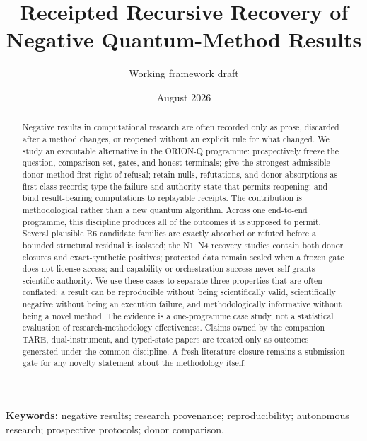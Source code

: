 \documentclass[11pt]{article}
\title{Receipted Recursive Recovery of Negative Quantum-Method Results}
\author{Working framework draft}
\date{August 2026}
\begin{document}
\maketitle

\begin{abstract}
Negative results in computational research are often recorded only as prose, discarded after a method changes, or reopened without an explicit rule for what changed. We study an executable alternative in the ORION-Q programme: prospectively freeze the question, comparison set, gates, and honest terminals; give the strongest admissible donor method first right of refusal; retain nulls, refutations, and donor absorptions as first-class records; type the failure and authority state that permits reopening; and bind result-bearing computations to replayable receipts. The contribution is methodological rather than a new quantum algorithm. Across one end-to-end programme, this discipline produces all of the outcomes it is supposed to permit. Several plausible R6 candidate families are exactly absorbed or refuted before a bounded structural residual is isolated; the N1--N4 recovery studies contain both donor closures and exact-synthetic positives; protected data remain sealed when a frozen gate does not license access; and capability or orchestration success never self-grants scientific authority. We use these cases to separate three properties that are often conflated: a result can be reproducible without being scientifically valid, scientifically negative without being an execution failure, and methodologically informative without being a novel method. The evidence is a one-programme case study, not a statistical evaluation of research-methodology effectiveness. Claims owned by the companion TARE, dual-instrument, and typed-state papers are treated only as outcomes generated under the common discipline. A fresh literature closure remains a submission gate for any novelty statement about the methodology itself.
\end{abstract}

\noindent\textbf{Keywords:} negative results; research provenance; reproducibility; autonomous research; prospective protocols; donor comparison.













\end{document}
